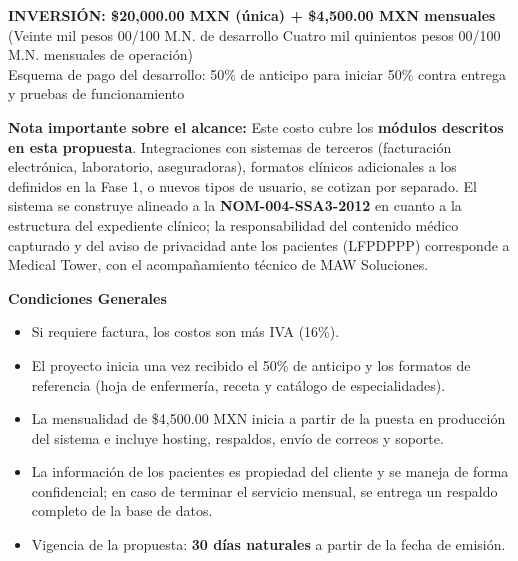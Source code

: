 \documentclass[11pt,letterpaper]{article}
\begin{document}
\vspace{12pt}

\begin{cajaTotal}
\begin{center}
{\Large\bfseries\color{verdeok}INVERSIÓN: \$20,000.00 MXN (única) + \$4,500.00 MXN mensuales}\\[4pt]
{\small\color{gristexto}(Veinte mil pesos 00/100 M.N. de desarrollo \textbar{} Cuatro mil quinientos pesos 00/100 M.N. mensuales de operación)}\\[4pt]
{\small\color{gristexto}Esquema de pago del desarrollo: 50\% de anticipo para iniciar \textbar{} 50\% contra entrega y pruebas de funcionamiento}
\end{center}
\end{cajaTotal}

\vspace{12pt}

\begin{cajaNota}
\textbf{\color{azulcom}Nota importante sobre el alcance:} Este costo cubre los \textbf{módulos descritos en esta propuesta}. Integraciones con sistemas de terceros (facturación electrónica, laboratorio, aseguradoras), formatos clínicos adicionales a los definidos en la Fase 1, o nuevos tipos de usuario, se cotizan por separado. El sistema se construye alineado a la \textbf{NOM-004-SSA3-2012} en cuanto a la estructura del expediente clínico; la responsabilidad del contenido médico capturado y del aviso de privacidad ante los pacientes (LFPDPPP) corresponde a Medical Tower, con el acompañamiento técnico de MAW Soluciones.
\end{cajaNota}

\vspace{14pt}

\begin{cajaNota}
\textbf{\color{azulcom}Condiciones Generales}
\begin{itemize}[leftmargin=14pt, itemsep=3pt, topsep=4pt]
    \item Si requiere factura, los costos son más IVA (16\%).
    \item El proyecto inicia una vez recibido el 50\% de anticipo y los formatos de referencia (hoja de enfermería, receta y catálogo de especialidades).
    \item La mensualidad de \$4,500.00 MXN inicia a partir de la puesta en producción del sistema e incluye hosting, respaldos, envío de correos y soporte.
    \item La información de los pacientes es propiedad del cliente y se maneja de forma confidencial; en caso de terminar el servicio mensual, se entrega un respaldo completo de la base de datos.
    \item Vigencia de la propuesta: \textbf{30 días naturales} a partir de la fecha de emisión.
\end{itemize}
\end{cajaNota}
\end{document}
